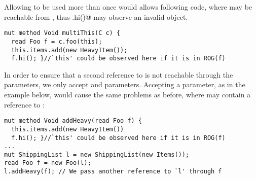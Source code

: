 

Allowing \Q@this@ to be used more than once 
would allows following code, where 
\Q@this@ may be reachable from \Q@f@, thus \Q@f.hi()@ may observe an invalid object.
\begin{lstlisting}
mut method Void multiThis(C c) {
  read Foo f = c.foo(this);
  this.items.add(new HeavyItem());
  f.hi(); }//`this' could be observed here if it is in ROG(f)
\end{lstlisting}
\noindent In order to ensure that a second reference to \Q@this@ is not reachable through the parameters, we only accept \Q@imm@ and \Q@capsule@ parameters.
Accepting a \Q@read@ parameter, as in the example below,
would cause the same problems as before, where \Q@f@ may contain
a reference to \Q@this@:
\begin{lstlisting}
mut method Void addHeavy(read Foo f) {
  this.items.add(new HeavyItem())
  f.hi(); }//`this' could be observed here if it is in ROG(f)
...
mut ShippingList l = new ShippingList(new Items());
read Foo f = new Foo(l);
l.addHeavy(f); // We pass another reference to `l' through f
\end{lstlisting}%
%
